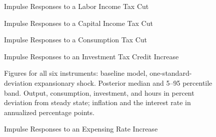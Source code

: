 \begin{figure}[ht]
\centering
{}
\caption{Impulse Responses to a Labor Income Tax Cut}
\label{fig:irf_w}
\end{figure}
\newpage

\begin{figure}[ht]
\centering
{}
\caption{Impulse Responses to a Capital Income Tax Cut}
\label{fig:irf_k}
\end{figure}
\newpage

\begin{figure}[ht]
\centering
{}
\caption{Impulse Responses to a Consumption Tax Cut}
\label{fig:irf_c}
\end{figure}
\newpage

\begin{figure}[ht]
\centering
{}
\caption{Impulse Responses to an Investment Tax Credit Increase}
\label{fig:irf_ic}
\end{figure}
\newpage

\begin{figure}[ht]
\centering
{}
\caption{Impulse Responses to an Expensing Rate Increase}
\label{fig:irf_etau}
\par\footnotesize Figures for all six instruments: baseline model, one-standard-deviation expansionary shock. Posterior median and 5--95 percentile band. Output, consumption, investment, and hours in percent deviation from steady state; inflation and the interest rate in annualized percentage points.
\end{figure}
